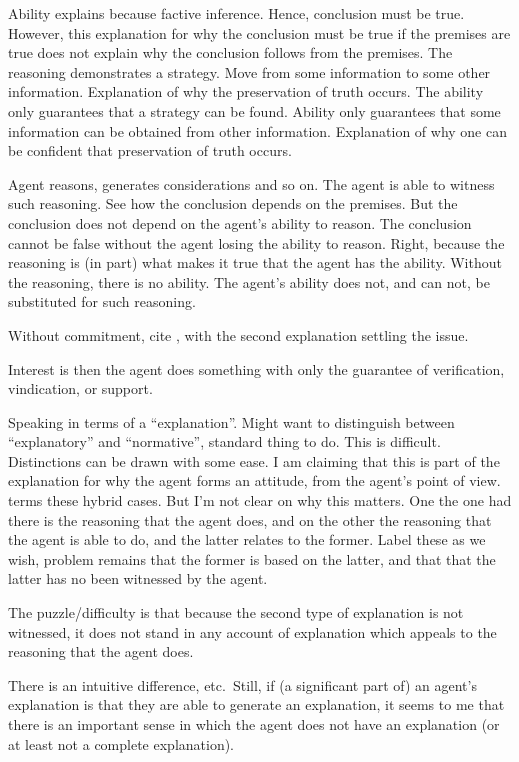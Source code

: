 \documentclass[10pt]{article}
\begin{document}
Ability explains because factive inference.
Hence, conclusion must be true.
However, this explanation for why the conclusion must be true if the premises are true does not explain why the conclusion follows from the premises.
The reasoning demonstrates a strategy.
Move from some information to some other information.
Explanation of why the preservation of truth occurs.
The ability only guarantees that a strategy can be found.
Ability only guarantees that some information can be obtained from other information.
Explanation of why one can be confident that preservation of truth occurs.




\begin{note}
Agent reasons, generates considerations and so on.
The agent is able to witness such reasoning.
See how the conclusion depends on the premises.
But the conclusion does not depend on the agent's ability to reason.
The conclusion cannot be false without the agent losing the ability to reason.
Right, because the reasoning is (in part) what makes it true that the agent has the ability.
Without the reasoning, there is no ability.
The agent's ability does not, and can not, be substituted for such reasoning.
\end{note}

Without commitment, cite \citeauthor{Hieronymi:2011aa}, with the second explanation settling the issue.

Interest is then the agent does something with only the guarantee of verification, vindication, or support.

Speaking in terms of a ``explanation''.
Might want to distinguish between ``explanatory'' and ``normative'', standard thing to do.
This is difficult.
Distinctions can be drawn with some ease.
I am claiming that this is part of the explanation for why the agent forms an attitude, from the agent's point of view.
\citeauthor{Hieronymi:2011aa} terms these hybrid cases.
But I'm not clear on why this matters.
One the one had there is the reasoning that the agent does, and on the other the reasoning that the agent is able to do, and the latter relates to the former.
Label these as we wish, problem remains that the former is based on the latter, and that that the latter has no been witnessed by the agent.

The puzzle/difficulty is that because the second type of explanation is not witnessed, it does not stand in any account of explanation which appeals to the reasoning that the agent does.

{
  \color{red}
  There is an intuitive difference, etc.\
  Still, if (a significant part of) an agent's explanation is that they are able to generate an explanation, it seems to me that there is an important sense in which the agent does not have an explanation (or at least not a complete explanation).
}
\end{document}
